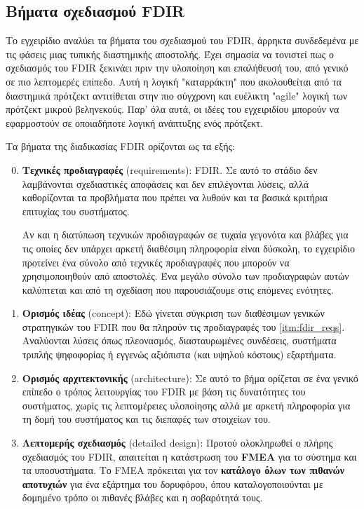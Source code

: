 \documentclass[a4paper,nobib]{tufte-book}
\begin{document}
\subsection{Βήματα σχεδιασμού \acs{FDIR}}
Το εγχειρίδιο αναλύει τα βήματα του σχεδιασμού του \acs{FDIR}, άρρηκτα συνδεδεμένα με τις φάσεις μιας τυπικής διαστημικής αποστολής. Έχει σημασία να τονιστεί πως ο σχεδιασμός του \acs{FDIR} ξεκινάει πριν την υλοποίηση και επαλήθευσή του, από γενικό σε πιο λεπτομερές επίπεδο. Αυτή η λογική "καταρράκτη" που ακολουθείται από τα διαστημικά πρότζεκτ αντιτίθεται στην πιο σύγχρονη και ευέλικτη "agile" λογική των πρότζεκτ μικρού βεληνεκούς. Παρ' όλα αυτά, οι ιδέες του εγχειριδίου μπορούν να εφαρμοστούν σε οποιαδήποτε λογική ανάπτυξης ενός πρότζεκτ.

Τα βήματα της διαδικασίας \acs{FDIR} ορίζονται ως τα εξής:
\begin{enumerate}
	\setcounter{enumi}{-1}
	\item \textbf{Τεχνικές προδιαγραφές} (requirements):  \acs{FDIR}. Σε αυτό το στάδιο δεν λαμβάνονται σχεδιαστικές αποφάσεις και δεν επιλέγονται λύσεις, αλλά καθορίζονται τα προβλήματα που πρέπει να λυθούν και τα βασικά κριτήρια επιτυχίας του συστήματος.
	\label{itm:fdir_reqs}
	
	Αν και η διατύπωση τεχνικών προδιαγραφών σε τυχαία γεγονότα και βλάβες για τις οποίες δεν υπάρχει αρκετή διαθέσιμη πληροφορία είναι δύσκολη, το εγχειρίδιο προτείνει ένα σύνολο από τεχνικές προδιαγραφές \autocite[42]{SAVOIR-HB-003} που μπορούν να χρησιμοποιηθούν από αποστολές. Ένα μεγάλο σύνολο των προδιαγραφών αυτών καλύπτεται και από τη σχεδίαση που παρουσιάζουμε στις επόμενες ενότητες.
	\item \textbf{Ορισμός ιδέας} (concept): Εδώ γίνεται σύγκριση των διαθέσιμων γενικών στρατηγικών του \acs{FDIR} που θα πληρούν τις προδιαγραφές του \cref{itm:fdir_reqs}. Αναλύονται λύσεις όπως πλεονασμός, διασταυρωμένες συνδέσεις, συστήματα τριπλής ψηφοφορίας ή εγγενώς αξιόπιστα (και υψηλού κόστους) εξαρτήματα.
	\label{itm:fdir_concept}
	\item \textbf{Ορισμός αρχιτεκτονικής} (architecture): Σε αυτό το βήμα ορίζεται σε ένα γενικό επίπεδο ο τρόπος λειτουργίας του \acs{FDIR} με βάση τις δυνατότητες του συστήματος, χωρίς τις λεπτομέρειες υλοποίησης αλλά με αρκετή πληροφορία για τη δομή του συστήματος και τις διεπαφές των στοιχείων του.
	\item \textbf{Λεπτομερής σχεδιασμός} (detailed design): Προτού ολοκληρωθεί ο πλήρης σχεδιασμός του \acs{FDIR}, απαιτείται η κατάστρωση του \textbf{\acf{FMEA}} \autocite{carlson_effective_fmeas_2012} για το σύστημα και τα υποσυστήματα. Το \acs{FMEA} πρόκειται για τον \textbf{κατάλογο όλων των πιθανών αποτυχιών} για ένα εξάρτημα του δορυφόρου, όπου καταλογοποιούνται με δομημένο τρόπο οι πιθανές βλάβες και η σοβαρότητά τους.
	

\end{enumerate}
\end{document}
